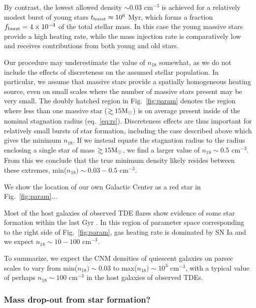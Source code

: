 \documentclass[usenatbib,fleqn]{mnras}
\newcommand\gsim{\mathrel{\rlap{\lower4pt\hbox{\hskip1pt$\sim$}}
    \raise1pt\hbox{$>$}}}
\newcommand{\Msun}{{\rm M_\odot}}
\begin{document}
By contrast, the lowest allowed density $\sim 0.03$ cm$^{-3}$ is
achieved for a relatively modest burst of young stars $t_{\rm burst}
\approx 10^{6}$ Myr, which forms a fraction $f_{\rm burst} = 4\times
10^{-4}$ of the total stellar mass. In this case the young massive
stars provide a high heating rate, while the mass injection rate is
comparatively low and receives contributions from both young and old
stars.

Our procedure may underestimate the value of $n_{18}$ somewhat, as we
do not include the effects of discreteness on the assumed stellar
population.  In particular, we assume that massive stars provide a
spatially homogeneous heating source, even on small scales where the
number of massive stars present may be very small.  The doubly hatched
region in Fig.~\ref{fig:param} denotes the region where less than one
massive star ($\gsim 15 \Msun$) is on average present inside of the
nominal stagnation radius (eq.~\ref{eq:rs}).  Discreteness effects are
thus important for relatively small bursts of star formation,
including the case described above which gives the minimum $n_{18}$.
If we instead equate the stagnation radius to the radius enclosing a
single star of mass $\gsim 15 \Msun$, we find a larger value of
$n_{18}\sim 0.5$ cm$^{-3}$.  From this we conclude that the true
minimum density likely resides between these extremes, min($n_{18})
\sim 0.03-0.5$ cm$^{-3}$.

We show the location of our own Galactic Center as a red star in
Fig.~\ref{fig:param}...

Most of the host galaxies of observed TDE flares show evidence of some
star formation within the last Gyr \citep{French+2016}.  In this
region of parameter space corresponding to the right side of
Fig.~\ref{fig:param}, gas heating rate is dominated by SN Ia and we
expect $n_{18}\sim 10-100$ cm$^{-3}$.

To summarize, we expect the CNM densities of quiescent galaxies on
parsec scales to vary from min($n_{18}) \sim 0.03$ to max($n_{18})\sim
10^{3}$ cm$^{-3}$, with a typical value of perhaps $n_{18}\sim 100$ cm$^{-3}$
in the host galaxies of observed TDEs.

\subsubsection{Mass drop-out from star formation?}
\end{document}
